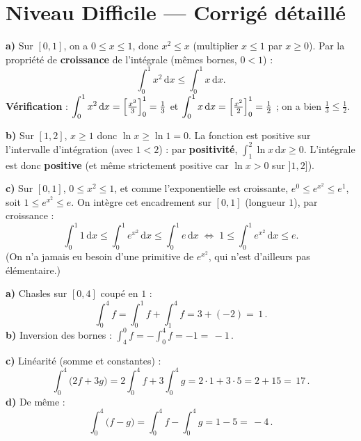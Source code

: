 \documentclass[11pt,a4paper]{article}
\newcommand{\dd}{\mathrm{d}}
\begin{document}
\section*{Niveau Difficile — Corrigé détaillé}

\begin{corr}
\textbf{a)} Sur $[0,1]$, on a $0\leqslant x\leqslant 1$, donc $x^2\leqslant x$ (multiplier
$x\leqslant 1$ par $x\geqslant 0$). Par la propriété de \textbf{croissance} de l'intégrale (mêmes
bornes, $0<1$) :
\[
\int_0^1 x^2\,\dd x\leqslant\int_0^1 x\,\dd x.
\]
\textbf{Vérification} : $\displaystyle\int_0^1 x^2\,\dd x=\Bigl[\tfrac{x^3}{3}\Bigr]_0^1=\tfrac13$ et
$\displaystyle\int_0^1 x\,\dd x=\Bigl[\tfrac{x^2}{2}\Bigr]_0^1=\tfrac12$ ; on a bien
$\tfrac13\leqslant\tfrac12$. \checkmark

\smallskip
\textbf{b)} Sur $[1,2]$, $x\geqslant 1$ donc $\ln x\geqslant \ln 1=0$. La fonction est positive sur
l'intervalle d'intégration (avec $1<2$) : par \textbf{positivité},
$\displaystyle\int_1^2 \ln x\,\dd x\geqslant 0$. L'intégrale est donc \textbf{positive} (et même
strictement positive car $\ln x>0$ sur $]1,2]$).

\smallskip
\textbf{c)} Sur $[0,1]$, $0\leqslant x^2\leqslant 1$, et comme l'exponentielle est croissante,
$e^{0}\leqslant e^{x^2}\leqslant e^{1}$, soit $1\leqslant e^{x^2}\leqslant e$. On intègre cet
encadrement sur $[0,1]$ (longueur $1$), par croissance :
\[
\int_0^1 1\,\dd x\leqslant\int_0^1 e^{x^2}\,\dd x\leqslant\int_0^1 e\,\dd x
\;\Longleftrightarrow\;
1\leqslant\int_0^1 e^{x^2}\,\dd x\leqslant e.
\]
(On n'a jamais eu besoin d'une primitive de $e^{x^2}$, qui n'est d'ailleurs pas élémentaire.)
\end{corr}

\begin{corr}
\textbf{a)} Chasles sur $[0,4]$ coupé en $1$ :
\[
\int_0^4 f=\int_0^1 f+\int_1^4 f=3+(-2)=\boxed{\,1\,}.
\]
\textbf{b)} Inversion des bornes : $\displaystyle\int_4^0 f=-\int_0^4 f=-1=\boxed{\,-1\,}.$

\smallskip
\textbf{c)} Linéarité (somme et constantes) :
\[
\int_0^4\bigl(2f+3g\bigr)=2\int_0^4 f+3\int_0^4 g=2\cdot 1+3\cdot 5=2+15=\boxed{\,17\,}.
\]
\textbf{d)} De même :
\[
\int_0^4\bigl(f-g\bigr)=\int_0^4 f-\int_0^4 g=1-5=\boxed{\,-4\,}.
\]
\end{corr}
\end{document}
